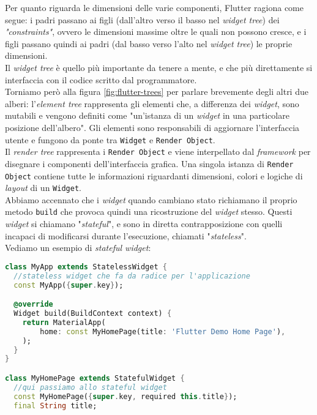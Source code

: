 \begin{appendices}
Per quanto riguarda le dimensioni delle varie componenti, Flutter ragiona come segue: i padri passano ai figli (dall'altro verso il basso nel \textit{widget tree}) dei \textit{"constraints"}, ovvero le dimensioni massime oltre le quali non possono cresce, e i figli passano quindi ai padri (dal basso verso l'alto nel \textit{widget tree}) le proprie dimensioni.\\
Il \textit{widget tree} è quello più importante da tenere a mente, e che più direttamente si interfaccia con il codice scritto dal programmatore. \\
Torniamo però alla figura \ref{fig:flutter-trees} per parlare brevemente degli altri due alberi: l'\textit{element tree} rappresenta gli elementi che, a differenza dei \textit{widget}, sono mutabili e vengono definiti come "un'istanza di un \textit{widget} in una particolare posizione dell'albero". Gli elementi sono responsabili di aggiornare l'interfaccia utente e fungono da ponte tra \verb+Widget+ e \verb+Render Object+.\\
Il \textit{render tree} rappresenta i \verb+Render Object+ e viene interpellato dal \textit{framework} per disegnare i componenti dell'interfaccia grafica. Una singola istanza di \verb+Render Object+ contiene tutte le informazioni riguardanti dimensioni, colori e logiche di \textit{layout} di un \verb+Widget+.\\
Abbiamo accennato che i \textit{widget} quando cambiano stato richiamano il proprio metodo \verb+build+ che provoca quindi una ricostruzione del \textit{widget} stesso. Questi \textit{widget} si chiamano "\textit{stateful}", e sono in diretta contrapposizione con quelli incapaci di modificarsi durante l'esecuzione, chiamati "\textit{stateless}". \\
Vediamo un esempio di \textit{stateful widget}:

\begin{lstlisting}[language=dart, label={lst:stateful_widget}, caption={Creazione \textit{stateless widget}}]
class MyApp extends StatelessWidget {
  //stateless widget che fa da radice per l'applicazione
  const MyApp({super.key});

  @override
  Widget build(BuildContext context) {
    return MaterialApp(
        home: const MyHomePage(title: 'Flutter Demo Home Page'),
    );
  }
}

class MyHomePage extends StatefulWidget {
  //qui passiamo allo stateful widget
  const MyHomePage({super.key, required this.title});
  final String title;


\end{lstlisting}
\end{appendices}
